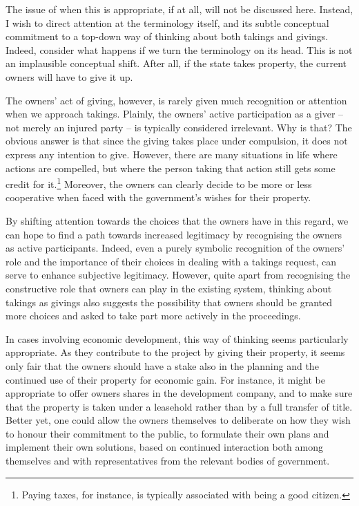 The issue of when this is appropriate, if at all, will not be discussed here. Instead, I wish to direct attention at the terminology itself, and its subtle conceptual commitment to a top-down way of thinking about both takings and givings. Indeed, consider what happens if we turn the terminology on its head. This is not an implausible conceptual shift. After all, if the state takes property, the current owners will have to give it up.

The owners' act of giving, however, is rarely given much recognition or attention when we approach takings. Plainly, the owners' active participation as a giver -- not merely an injured party -- is typically considered irrelevant. Why is that? The obvious answer is that since the giving takes place under compulsion, it does not express any intention to give. However, there are many situations in life where actions are compelled, but where the person taking that action still gets some credit for it.\footnote{Paying taxes, for instance, is typically associated with being a good citizen.} Moreover, the owners can clearly decide to be more or less cooperative when faced with the government's wishes for their property. 

By shifting attention towards the choices that the owners have in this regard, we can hope to find a path towards increased legitimacy by recognising the owners as active participants. Indeed, even a purely symbolic recognition of the owners' role and the importance of their choices in dealing with a takings request, can serve to enhance subjective legitimacy. However, quite apart from recognising the constructive role that owners can play in the existing system, thinking about takings as givings also suggests the possibility that owners should be granted more choices and asked to take part more actively in the proceedings.


In cases involving economic development, this way of thinking seems particularly appropriate. As they contribute to the project by giving their property, it seems only fair that the owners should have a stake also in the planning and the continued use of their property for economic gain. For instance, it might be appropriate to offer owners shares in the development company, and to make sure that the property is taken under a leasehold rather than by a full transfer of title. Better yet, one could allow the owners themselves to deliberate on how they wish to honour their commitment to the public, to formulate their own plans and implement their own solutions, based on continued interaction both among themselves and with representatives from the relevant bodies of government.

